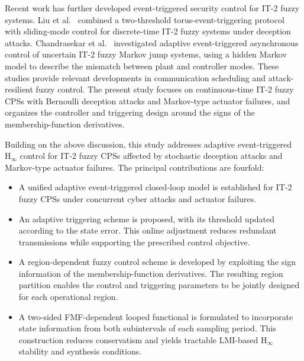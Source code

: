 \documentclass[preprint,review,fleqn,sort&compress,3p]{elsarticle}
\theoremstyle{definition} %
\theoremstyle{definition}%
\begin{document}
Recent work has further developed event-triggered security control for IT-2 fuzzy systems. Liu et al.\ \cite{liuTorusEventBased2025} combined a two-threshold torus-event-triggering protocol with sliding-mode control for discrete-time IT-2 fuzzy systems under deception attacks. Chandrasekar et al.\ \cite{chandrasekarAdaptiveEvent2026} investigated adaptive event-triggered asynchronous control of uncertain IT-2 fuzzy Markov jump systems, using a hidden Markov model to describe the mismatch between plant and controller modes. These studies provide relevant developments in communication scheduling and attack-resilient fuzzy control. The present study focuses on continuous-time IT-2 fuzzy CPSs with Bernoulli deception attacks and Markov-type actuator failures, and organizes the controller and triggering design around the signs of the membership-function derivatives.

Building on the above discussion, this study addresses adaptive event-triggered
$\mathrm{H}_\infty$ control for IT-2 fuzzy CPSs affected by stochastic deception
attacks and Markov-type actuator failures. The principal contributions are fourfold:

\begin{itemize}
	\item[1)] A unified adaptive event‑triggered closed‑loop model is established for IT‑2 fuzzy CPSs under concurrent cyber attacks and actuator failures.
	\item[2)] An adaptive triggering scheme is proposed, with its threshold updated according to the state error. This online adjustment reduces redundant transmissions while supporting the prescribed control objective.
	\item[3)] A region-dependent fuzzy control scheme is developed by exploiting the sign information of the membership-function derivatives. The resulting region partition enables the control and triggering parameters to be jointly designed for each operational region.
	\item[4)] A two-sided FMF-dependent looped functional is formulated to incorporate state information from both subintervals of each sampling period. This construction reduces conservatism and yields tractable LMI-based $\mathrm{H}_\infty$ stability and synthesis conditions.
\end{itemize}
\end{document}
